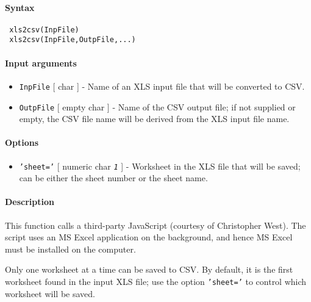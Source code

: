 


	\paragraph{Syntax}
 
 \begin{verbatim}
 xls2csv(InpFile)
 xls2csv(InpFile,OutpFile,...)
 \end{verbatim}
 
 \paragraph{Input arguments}
 
 \begin{itemize}
 \item
   \texttt{InpFile} {[} char {]} - Name of an XLS input file that will be
   converted to CSV.
 \item
   \texttt{OutpFile} {[} empty \textbar{} char {]} - Name of the CSV
   output file; if not supplied or empty, the CSV file name will be
   derived from the XLS input file name.
 \end{itemize}
 
 \paragraph{Options}
 
 \begin{itemize}
 \item
   \texttt{'sheet='} {[} numeric \textbar{} char \textbar{}
   \emph{\texttt{1}} {]} - Worksheet in the XLS file that will be saved;
   can be either the sheet number or the sheet name.
 \end{itemize}
 
 \paragraph{Description}
 
 This function calls a third-party JavaScript (courtesy of Christopher
 West). The script uses an MS Excel application on the background, and
 hence MS Excel must be installed on the computer.
 
 Only one worksheet at a time can be saved to CSV. By default, it is the
 first worksheet found in the input XLS file; use the option
 \texttt{'sheet='} to control which worksheet will be saved.
 
